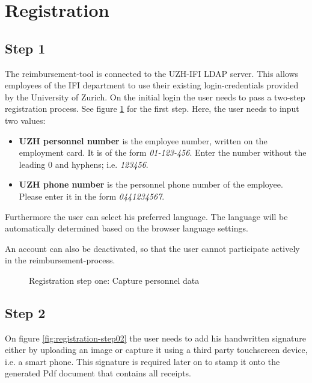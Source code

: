 \section{Registration}
\label{sec:registration}

\subsection{Step 1}
The reimbursement-tool is connected to the UZH-IFI LDAP server. This allows employees of the IFI department to use their existing login-credentials provided by the University of Zurich.\newline
On the initial login the user needs to pass a two-step registration process. See figure \ref{fig:registration-step01} for the first step. Here, the user needs to input two values:
\begin{itemize}
    \item \textbf{UZH personnel number} is the employee number, written on the employment card. It is of the form \textit{01-123-456}. Enter the number without the leading 0 and hyphens; i.e. \textit{123456}.
    \item \textbf{UZH phone number} is the personnel phone number of the employee. Please enter it in the form \textit{0441234567}.
\end{itemize}\newpage

Furthermore the user can select his preferred language. The language will be automatically determined based on the browser language settings.\par
An account can also be deactivated, so that the user cannot participate actively in the reimbursement-process.

\begin{figure}[H]
    \centering
    \caption{Registration step one: Capture personnel data}
    \label{fig:registration-step01}
\end{figure}

\subsection{Step 2}
On figure \ref{fig:registration-step02} the user needs to add his handwritten signature either by uploading an image or capture it using a third party touchscreen device, i.e. a smart phone. This signature is required later on to stamp it onto the generated Pdf document that contains all receipts.

